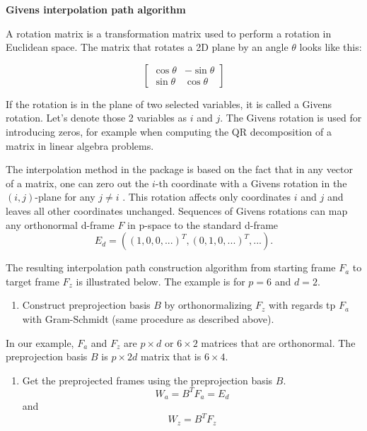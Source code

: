 \textbf{Givens interpolation path algorithm}

A rotation matrix is a transformation matrix used to perform a rotation in Euclidean space. The matrix that rotates a 2D plane by an angle \(\theta\) looks like this:

\[ \begin{bmatrix}\cos \theta &-\sin \theta \\\sin \theta &\cos \theta \end{bmatrix} \]

If the rotation is in the plane of two selected variables, it is called a Givens rotation. Let's denote those 2 variables as \(i\) and \(j\). The Givens rotation is used for introducing zeros, for example when computing the QR decomposition of a matrix in linear algebra problems.

The interpolation method in the  package is based on the fact that in any vector of a matrix, one can zero out the \(i\)-th coordinate with a Givens rotation in the \((i, j)\)-plane for any \(j\neq i\) \citep{matrix_computation}. This rotation affects only coordinates \(i\) and \(j\) and leaves all other coordinates unchanged.
Sequences of Givens rotations can map any orthonormal d-frame \(F\) in p-space to the standard d-frame
\[E_d=((1, 0, 0, ...)^T, (0, 1, 0, ...)^T, ...).\]

The resulting interpolation path construction algorithm from starting frame \(F_a\) to target frame \(F_z\) is illustrated below. The example is for \(p=6\) and \(d=2\).

\begin{enumerate}
\def\labelenumi{\arabic{enumi}.}
\tightlist
\item
  Construct preprojection basis \(B\) by orthonormalizing \(F_z\) with regards tp \(F_a\) with Gram-Schmidt (same procedure as described above).
\end{enumerate}

In our example, \(F_a\) and \(F_z\) are \(p\times d\) or \(6\times2\) matrices that are orthonormal. The preprojection basis \(B\) is \(p\times 2d\) matrix that is \(6\times 4\).

\begin{enumerate}
\def\labelenumi{\arabic{enumi}.}
\setcounter{enumi}{1}
\tightlist
\item
  Get the preprojected frames using the preprojection basis \(B\).
  \[W_a = B^TF_a = E_d\] and \[W_z = B^TF_z\]
\end{enumerate}

